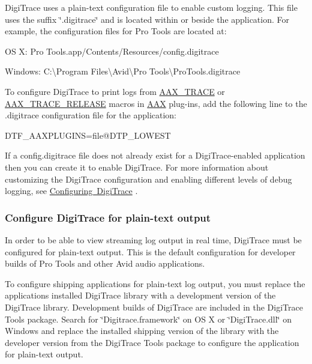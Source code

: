  Digi\+Trace uses a plain-\/text configuration file to enable custom logging. This file uses the suffix \char`\"{}.\+digitrace\char`\"{} and is located within or beside the application. For example, the configuration files for Pro Tools are located at\+:
\begin{DoxyItemize}
\item OS X\+: Pro Tools.\+app/\+Contents/\+Resources/config.digitrace
\item Windows\+: C\+:\textbackslash{}Program Files\textbackslash{}Avid\textbackslash{}Pro Tools\textbackslash{}Pro\+Tools.\+digitrace
\end{DoxyItemize}

 To configure Digi\+Trace to print logs from \mbox{\hyperlink{a00395_ab53f1d6a94f8b6ebb3a101f71bfe4e82}{A\+A\+X\+\_\+\+T\+R\+A\+CE}} or \mbox{\hyperlink{a00395_ac2aa820ece56bb59140ad561218db4b3}{A\+A\+X\+\_\+\+T\+R\+A\+C\+E\+\_\+\+R\+E\+L\+E\+A\+SE}} macros in \mbox{\hyperlink{a00852}{A\+AX}} plug-\/ins, add the following line to the .digitrace configuration file for the application\+:

 D\+T\+F\+\_\+\+A\+A\+X\+P\+L\+U\+G\+I\+NS=file@D\+T\+P\+\_\+\+L\+O\+W\+E\+ST 

 If a config.\+digitrace file does not already exist for a Digi\+Trace-\/enabled application then you can create it to enable Digi\+Trace. For more information about customizing the Digi\+Trace configuration and enabling different levels of debug logging, see \mbox{\hyperlink{a00834_digitrace__configuring}{Configuring Digi\+Trace}} .

\hypertarget{a00834_digitrace__gettingstarted__configurefordevelopment}{}\subsubsection{Configure Digi\+Trace for plain-\/text output}\label{a00834_digitrace__gettingstarted__configurefordevelopment}
 In order to be able to view streaming log output in real time, Digi\+Trace must be configured for plain-\/text output. This is the default configuration for developer builds of Pro Tools and other Avid audio applications.

 To configure shipping applications for plain-\/text log output, you must replace the application\textquotesingle{}s installed Digi\+Trace library with a development version of the Digi\+Trace library. Development builds of Digi\+Trace are included in the Digi\+Trace Tools package. Search for \char`\"{}\+Digitrace.\+framework\char`\"{} on OS X or \char`\"{}\+Digi\+Trace.\+dll\char`\"{} on Windows and replace the installed shipping version of the library with the developer version from the Digi\+Trace Tools package to configure the application for plain-\/text output.

